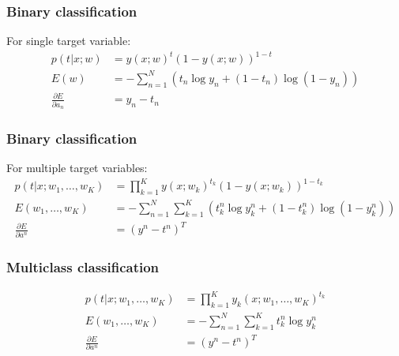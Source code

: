 \documentclass{beamer}
\begin{document}
\begin{frame}
    \frametitle{Binary classification}
    For single target variable:
    \begin{align*}
        p(t|x;w)&=y(x;w)^{t}(1-y(x;w))^{1-t} \\
        E(w)&=-\sum_{n=1}^{N}(t_{n}\log{}y_{n}+(1-t_{n})\log(1-y_{n})) \\
        \frac{\partial{}E}{\partial{}a_{n}}&=y_{n}-t_{n}
    \end{align*}
\end{frame}

\begin{frame}
    \frametitle{Binary classification}
    For multiple target variables:
    \begin{align*}
        p(t|x;w_{1},\hdots,w_{K})&=\prod_{k=1}^{K}y(x;w_{k})^{t_{k}}(1-y(x;w_{k}))^{1-t_{k}} \\
        E(w_{1},\hdots,w_{K})&=-\sum_{n=1}^{N}\sum_{k=1}^{K}(t^{n}_{k}\log{}y^{n}_{k}+(1-t^{n}_{k})\log(1-y^{n}_{k})) \\
        \frac{\partial{}E}{\partial{}a^{n}}&=(y^{n}-t^{n})^{T}
    \end{align*}
\end{frame}

\begin{frame}
    \frametitle{Multiclass classification}
    \begin{align*}
        p(t|x;w_{1},\hdots,w_{K})&=\prod_{k=1}^{K}y_{k}(x;w_{1},\hdots,w_{K})^{t_{k}} \\
        E(w_{1},\hdots,w_{K})&=-\sum_{n=1}^{N}\sum_{k=1}^{K}t^{n}_{k}\log{}y^{n}_{k} \\
        \frac{\partial{}E}{\partial{}a^{n}}&=(y^{n}-t^{n})^{T}
    \end{align*}
\end{frame}
\end{document}
